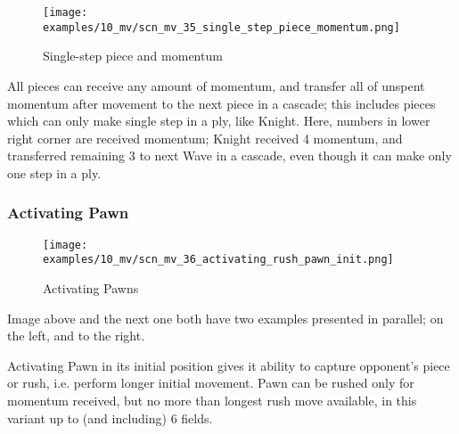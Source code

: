 \vspace*{-1.5\baselineskip}
\noindent
\begin{figure}[h]
\texttt{[image: examples/10\_mv/scn\_mv\_35\_single\_step\_piece\_momentum.png]}
\vspace*{-1.4\baselineskip}
\caption{Single-step piece and momentum}
\label{fig:scn_mv_35_single_step_piece_momentum}
\end{figure}

\vspace*{-0.5\baselineskip}
All pieces can receive any amount of momentum, and transfer all of unspent momentum
after movement to the next piece in a cascade; this includes pieces which can only
make single step in a ply, like Knight. \newline
\indent
Here, numbers in lower right corner are received momentum; Knight received 4 momentum,
and transferred remaining 3 to next Wave in a cascade, even though it can make only one
step in a ply.

\clearpage %

\subsubsection*{Activating Pawn}
\label{sec:Miranda's veil/Wave/Cascading Waves/Activating Pawn}

\vspace*{-1.4\baselineskip}
\noindent
\begin{figure}[!h]
\texttt{[image: examples/10\_mv/scn\_mv\_36\_activating\_rush\_pawn\_init.png]}
\vspace*{-1.3\baselineskip}
\caption{Activating Pawns}
\label{fig:scn_mv_36_activating_rush_pawn_init}
\end{figure}

\vspace*{-0.3\baselineskip}
Image above and the next one both have two examples presented in parallel; on the left,
and to the right.

Activating Pawn in its initial position gives it ability to capture opponent's
piece or rush, i.e. perform longer initial movement. Pawn can be rushed only for
momentum received, but no more than longest rush move available, in this variant
up to (and including) 6 fields.

